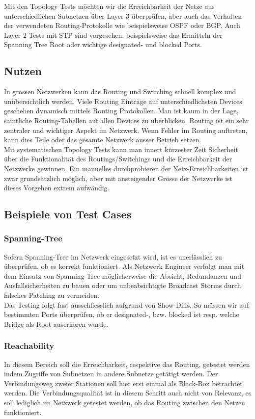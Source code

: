 \documentclass[a4,12pt]{scrartcl}
\begin{document}
\noindent Mit den Topology Tests möchten wir die Erreichbarkeit der Netze aus unterschiedlichen Subnetzen über Layer 3 überprüfen, aber auch das Verhalten der verwendeten Routing-Protokolle wie beispielsweise OSPF oder BGP. Auch Layer 2 Tests mit STP sind vorgesehen, beispielsweise das Ermitteln der Spanning Tree Root oder wichtige designated- und blocked Ports.\\ 
\subsection{Nutzen}
In grossen Netzwerken kann das Routing und Switching schnell komplex und unübersichtlich werden. Viele Routing Einträge auf unterschiedlichsten Devices geschehen dynamisch mittels Routing Protokollen. Man ist kaum in der Lage, sämtliche Routing-Tabellen auf allen Devices zu überblicken. Routing ist ein sehr zentraler und wichtiger Aspekt im Netzwerk. Wenn Fehler im Routing auftreten, kann dies Teile oder das gesamte Netzwerk ausser Betrieb setzen.\\

\noindent Mit systematischen Topology Tests kann man innert kürzester Zeit Sicherheit über die Funktionalität des Routings/Switchings und die Erreichbarkeit der Netzwerke gewinnen. Ein manuelles durchprobieren der Netz-Erreichbarkeiten ist zwar grundsätzlich möglich, aber mit ansteigender Grösse der Netzwerke ist dieses Vorgehen extrem aufwändig. 
\subsection{Beispiele von Test Cases}
\subsubsection{Spanning-Tree}
Sofern Spanning-Tree im Netzwerk eingesetzt wird, ist es unerlässlich zu überprüfen, ob es korrekt funktioniert. Als Netzwerk Engineer verfolgt man mit dem Einsatz von Spanning Tree möglicherweise die Absicht, Redundanzen und Ausfallsicherheiten zu bauen oder um unbeabsichtigte Broadcast Storms durch falsches Patching zu vermeiden.\\

\noindent Das Testing folgt fast ausschliesslich aufgrund von Show-Diffs. So müssen wir auf bestimmten Ports überprüfen, ob er designated-, bzw. blocked ist resp. welche Bridge als Root auserkoren wurde.  
\subsubsection{Reachability}
In diesem Bereich soll die Erreichbarkeit, respektive das Routing, getestet werden indem Zugriffe von Subnetzen in andere Subnetze getätigt werden. Der Verbindungsweg zweier Stationen soll hier erst einmal als Black-Box betrachtet werden. Die Verbindungsqualität ist in diesem Schritt auch nicht von Relevanz, es soll lediglich im Netzwerk getestet werden, ob das Routing zwischen den Netzen funktioniert.\\
\end{document}
